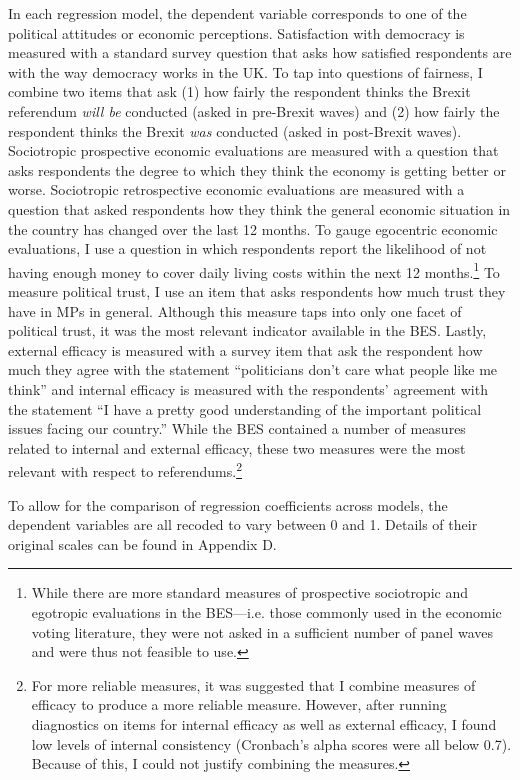 \documentclass[12pt, letter]{article}
\begin{document}
In each regression model, the dependent variable corresponds to one of the political attitudes or economic perceptions. Satisfaction with democracy is measured with a standard survey question that asks how satisfied respondents are with the way democracy works in the UK. To tap into questions of fairness, I combine two items that ask (1) how fairly the respondent thinks the Brexit referendum \textit{will be} conducted (asked in pre-Brexit waves) and (2) how fairly the respondent thinks the Brexit \textit{was} conducted (asked in post-Brexit waves). Sociotropic prospective economic evaluations are measured with a question that asks respondents the degree to which they think the economy is getting better or worse. Sociotropic retrospective economic evaluations are measured with a question that asked respondents how they think the general economic situation in the country has changed over the last 12 months. To gauge egocentric economic evaluations, I use a question in which respondents report the likelihood of not having enough money to cover daily living costs within the next 12 months.\footnote{While there are more standard measures of prospective sociotropic and egotropic evaluations in the BES---i.e. those commonly used in the economic voting literature, they were not asked in a sufficient number of panel waves and were thus not feasible to use.} To measure political trust, I use an item that asks respondents how much trust they have in MPs in general. Although this measure  taps into only one facet of political trust, it was the most relevant indicator available in the BES. Lastly, external efficacy is measured with a survey item that ask the respondent how much they agree with the statement ``politicians don't care what people like me think'' and internal efficacy is measured with the respondents' agreement with the statement ``I have a pretty good understanding of the important political issues facing our country.'' While the BES contained a number of measures related to internal and external efficacy, these two measures were the most relevant with respect to referendums.\footnote{For more reliable measures, it was suggested that I combine measures of efficacy to produce a more reliable measure. However, after running diagnostics on items for internal efficacy as well as external efficacy, I found low levels of internal consistency (Cronbach's alpha scores were all below 0.7). Because of this, I could not justify combining the measures.}

To allow for the comparison of regression coefficients across models, the dependent variables are all recoded to vary between 0 and 1. Details of their original scales can be found in Appendix D.
\end{document}
